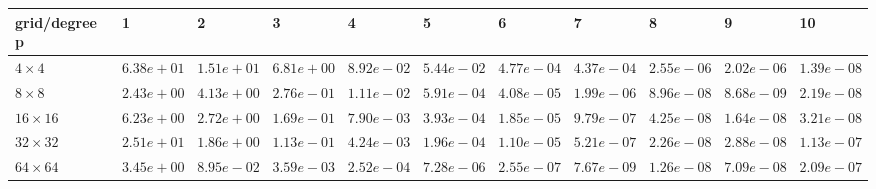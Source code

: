 \begin{tabular}{lllllllllll}
\hline
 grid/degree p   & 1          & 2          & 3          & 4          & 5          & 6          & 7          & 8          & 9          & 10         \\
\hline
 $4 \times 4$    & $6.38e+01$ & $1.51e+01$ & $6.81e+00$ & $8.92e-02$ & $5.44e-02$ & $4.77e-04$ & $4.37e-04$ & $2.55e-06$ & $2.02e-06$ & $1.39e-08$ \\
 $8 \times 8$    & $2.43e+00$ & $4.13e+00$ & $2.76e-01$ & $1.11e-02$ & $5.91e-04$ & $4.08e-05$ & $1.99e-06$ & $8.96e-08$ & $8.68e-09$ & $2.19e-08$ \\
 $16 \times 16$  & $6.23e+00$ & $2.72e+00$ & $1.69e-01$ & $7.90e-03$ & $3.93e-04$ & $1.85e-05$ & $9.79e-07$ & $4.25e-08$ & $1.64e-08$ & $3.21e-08$ \\
 $32 \times 32$  & $2.51e+01$ & $1.86e+00$ & $1.13e-01$ & $4.24e-03$ & $1.96e-04$ & $1.10e-05$ & $5.21e-07$ & $2.26e-08$ & $2.88e-08$ & $1.13e-07$ \\
 $64 \times 64$  & $3.45e+00$ & $8.95e-02$ & $3.59e-03$ & $2.52e-04$ & $7.28e-06$ & $2.55e-07$ & $7.67e-09$ & $1.26e-08$ & $7.09e-08$ & $2.09e-07$ \\
\hline
\end{tabular}